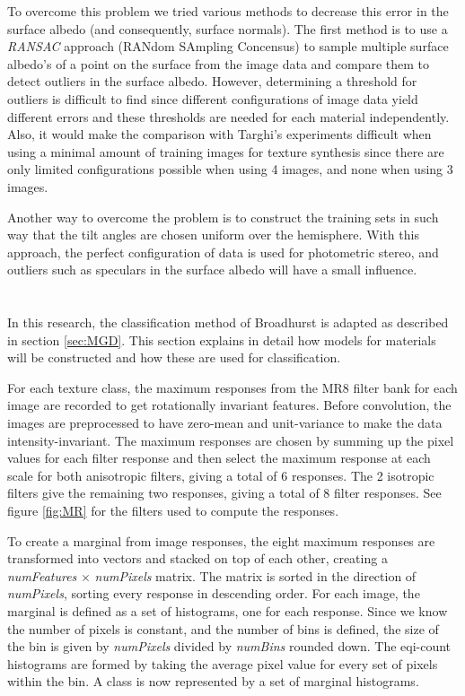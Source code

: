 To overcome this problem we tried various methods to decrease this error in the surface albedo (and consequently, surface normals). The first method is to use a {\it RANSAC} approach (RANdom SAmpling Concensus) to sample multiple surface albedo's of a point on the surface from the image data and compare them to detect outliers in the surface albedo. However, determining a threshold for outliers is difficult to find since different configurations of image data yield different errors and these thresholds are needed for each material independently. Also, it would make the comparison with Targhi's experiments difficult when using a minimal amount of training images for texture synthesis since there are only limited configurations possible when using 4 images, and none when using 3 images. 

Another way to overcome the problem is to construct the training sets in such way that the tilt angles are chosen uniform over the hemisphere. With this approach, the perfect configuration of data is used for photometric stereo, and outliers such as speculars in the surface albedo will have a small influence.

\section{}\label{sec:Classification}

In this research, the classification method of Broadhurst is adapted as described in section \ref{sec:MGD}. This section explains in detail how models for materials will be constructed and how these are used for classification.

For each texture class, the maximum responses from the MR8 filter bank for each image are recorded to get rotationally invariant features. Before convolution, the images are preprocessed to have zero-mean and unit-variance to make the data intensity-invariant. The maximum responses are chosen by summing up the pixel values for each filter response and then select the maximum response at each scale for both anisotropic filters, giving a total of 6 responses. The 2 isotropic filters give the remaining two responses, giving a total of 8 filter responses. See figure \ref{fig:MR} for the filters used to compute the responses.

To create a marginal from image responses, the eight maximum responses are transformed into vectors and stacked on top of each other, creating a {\it numFeatures} $\times$ {\it numPixels} matrix. The matrix is sorted in the direction of {\it numPixels}, sorting every response in descending order. For each image, the marginal is defined as a set of histograms, one for each response. Since we know the number of pixels is constant, and the number of bins is defined, the size of the bin is given by {\it numPixels} divided by {\it numBins} rounded down. The eqi-count histograms are formed by taking the average pixel value for every set of pixels within the bin. A class is now represented by a set of marginal histograms.

